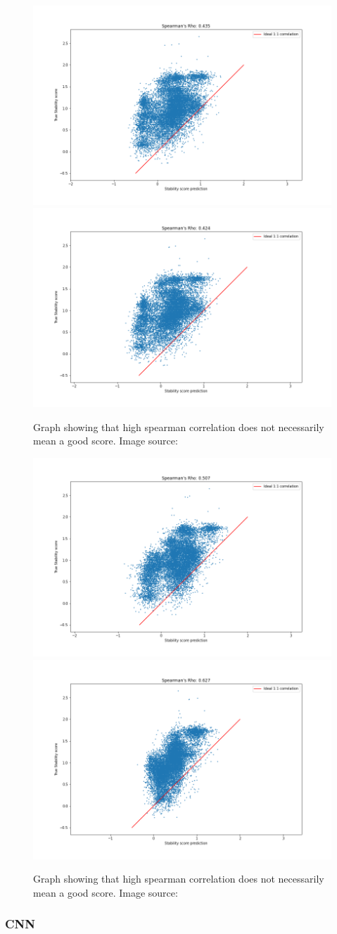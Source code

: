 \begin{figure}[!ht]
  \centering
  \includegraphics[width=0.4\linewidth]{latex/imgs/spearman_1_layer_with_schedule_256_final.png}
  \includegraphics[width=0.4\linewidth]{latex/imgs/spearman_1_layer_with_schedule_256_minloss.png}
  \caption{Graph showing that high spearman correlation does not necessarily mean a good score. Image source:\cite{spearman}}
\end{figure}
\begin{figure}[!ht]
  \centering
  \includegraphics[width=0.4\linewidth]{latex/imgs/spearman_1_layer_with_schedule_1024_final.png}
  \includegraphics[width=0.4\linewidth]{latex/imgs/spearman_1_layer_with_schedule_1024_minloss.png}
  \caption{Graph showing that high spearman correlation does not necessarily mean a good score. Image source:\cite{spearman}}
\end{figure}

\subsubsection{CNN}